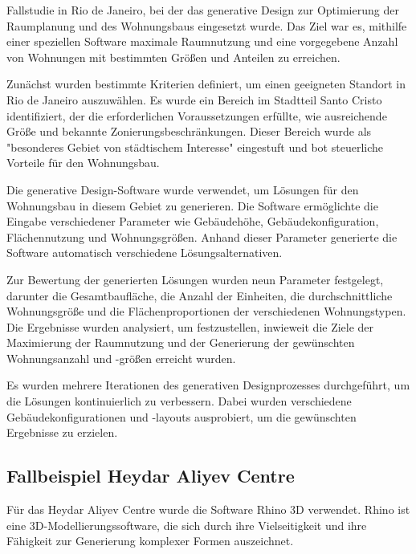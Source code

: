 Fallstudie in Rio de Janeiro, bei der das generative Design zur Optimierung der Raumplanung und des Wohnungsbaus eingesetzt wurde. Das Ziel war es, mithilfe einer speziellen Software maximale Raumnutzung und eine vorgegebene Anzahl von Wohnungen mit bestimmten Größen und Anteilen zu erreichen.

Zunächst wurden bestimmte Kriterien definiert, um einen geeigneten Standort in Rio de Janeiro auszuwählen. Es wurde ein Bereich im Stadtteil Santo Cristo identifiziert, der die erforderlichen Voraussetzungen erfüllte, wie ausreichende Größe und bekannte Zonierungsbeschränkungen. Dieser Bereich wurde als "besonderes Gebiet von städtischem Interesse" eingestuft und bot steuerliche Vorteile für den Wohnungsbau.

Die generative Design-Software wurde verwendet, um Lösungen für den Wohnungsbau in diesem Gebiet zu generieren. Die Software ermöglichte die Eingabe verschiedener Parameter wie Gebäudehöhe, Gebäudekonfiguration, Flächennutzung und Wohnungsgrößen. Anhand dieser Parameter generierte die Software automatisch verschiedene Lösungsalternativen.

Zur Bewertung der generierten Lösungen wurden neun Parameter festgelegt, darunter die Gesamtbaufläche, die Anzahl der Einheiten, die durchschnittliche Wohnungsgröße und die Flächenproportionen der verschiedenen Wohnungstypen. Die Ergebnisse wurden analysiert, um festzustellen, inwieweit die Ziele der Maximierung der Raumnutzung und der Generierung der gewünschten Wohnungsanzahl und -größen erreicht wurden.

Es wurden mehrere Iterationen des generativen Designprozesses durchgeführt, um die Lösungen kontinuierlich zu verbessern. Dabei wurden verschiedene Gebäudekonfigurationen und -layouts ausprobiert, um die gewünschten Ergebnisse zu erzielen.



\subsection*{Fallbeispiel Heydar Aliyev Centre}
Für das Heydar Aliyev Centre wurde die Software Rhino 3D verwendet. Rhino ist eine 3D-Modellierungssoftware, die sich durch ihre Vielseitigkeit und ihre Fähigkeit zur Generierung komplexer Formen auszeichnet.

